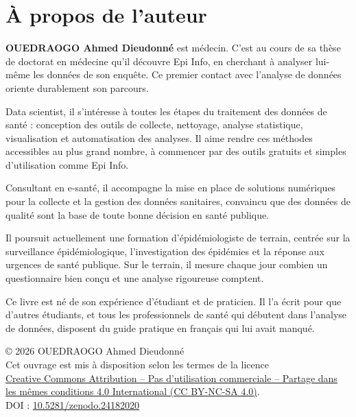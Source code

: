 \chapter*{À propos de l'auteur}
\label{auteur}

\textbf{OUEDRAOGO Ahmed Dieudonné} est médecin. C'est au cours de sa thèse de doctorat en médecine qu'il découvre Epi Info, en cherchant à analyser lui-même les données de son enquête. Ce premier contact avec l'analyse de données oriente durablement son parcours.

Data scientist, il s'intéresse à toutes les étapes du traitement des données de santé : conception des outils de collecte, nettoyage, analyse statistique, visualisation et automatisation des analyses. Il aime rendre ces méthodes accessibles au plus grand nombre, à commencer par des outils gratuits et simples d'utilisation comme Epi Info.

Consultant en e-santé, il accompagne la mise en place de solutions numériques pour la collecte et la gestion des données sanitaires, convaincu que des données de qualité sont la base de toute bonne décision en santé publique.

Il poursuit actuellement une formation d'épidémiologiste de terrain, centrée sur la surveillance épidémiologique, l'investigation des épidémies et la réponse aux urgences de santé publique. Sur le terrain, il mesure chaque jour combien un questionnaire bien conçu et une analyse rigoureuse comptent.

Ce livre est né de son expérience d'étudiant et de praticien. Il l'a écrit pour que d'autres étudiants, et tous les professionnels de santé qui débutent dans l'analyse de données, disposent du guide pratique en français qui lui avait manqué.

\vfill
\begin{center}
	\small
	© 2026 OUEDRAOGO Ahmed Dieudonné\\[0.5ex]
	Cet ouvrage est mis à disposition selon les termes de la licence\\
	\href{https://creativecommons.org/licenses/by-nc-sa/4.0/deed.fr}{Creative Commons Attribution -- Pas d'utilisation commerciale -- Partage dans les mêmes conditions 4.0 International (CC BY-NC-SA 4.0)}.\\[0.5ex]
	DOI : \href{https://doi.org/10.5281/zenodo.24182020}{10.5281/zenodo.24182020}
\end{center}
